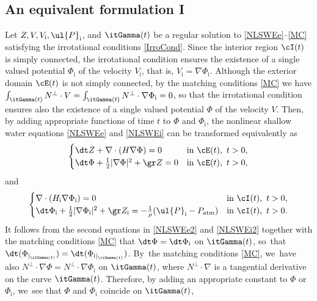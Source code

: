 \subsection{An equivalent formulation I}\label{subsect:EF1}
Let $Z,V,V_\mathrm{i},\ul{P}_\mathrm{i}$, and $\itGamma(t)$ be a regular solution to \eqref{NLSWEe}--\eqref{MC} satisfying the irrotational conditions \eqref{IrroCond}.
Since the interior region $\cI(t)$ is simply connected, the irrotational condition ensures the existence of a single valued potential $\Phi_\mathrm{i}$
of the velocity $V_\mathrm{i}$, that is, $V_\mathrm{i}=\nabla\Phi_\mathrm{i}$.
Although the exterior domain $\cE(t)$ is not simply connected, by the matching conditions \eqref{MC} we have
$\int_{\itGamma(t)}N^\perp\cdot V=\int_{\itGamma(t)}N^\perp\cdot\nabla\Phi_\mathrm{i}=0$,
so that the irrotational condition ensures also the existence of a single valued potential $\Phi$ of the velocity $V$.
Then, by adding appropriate functions of time $t$ to $\Phi$ and $\Phi_\mathrm{i}$,
the nonlinear shallow water equations \eqref{NLSWEe} and \eqref{NLSWEi} can be transformed equivalently as
\begin{equation}\label{NLSWEe2}
\begin{cases}
\dt Z+\nabla\cdot(H\nabla\Phi)=0 &\text{in } \cE(t), \ t>0, \\
\dt\Phi + \frac12|\nabla\Phi|^2 + \gr Z = 0 &\text{in } \cE(t), \ t>0,
\end{cases}
\end{equation}
and
\begin{equation}\label{NLSWEi2}
\begin{cases}
\nabla\cdot(H_\mathrm{i}\nabla\Phi_\mathrm{i})=0 &\text{in } \cI(t), \ t>0, \\
\dt\Phi_\mathrm{i} + \frac12|\nabla\Phi_\mathrm{i}|^2 + \gr Z_\mathrm{i} = -\frac{1}{\rho}(\ul{P}_\mathrm{i}-P_\mathrm{atm}) &\text{in } \cI(t), \ t>0.
\end{cases}
\end{equation}
It follows from the second equations in \eqref{NLSWEe2} and \eqref{NLSWEi2} together with the matching conditions \eqref{MC} that
$\dt\Phi=\dt\Phi_\mathrm{i}$ on $\itGamma(t)$, so~that $\dt(\Phi_{\vert_{\itGamma(t)}})=\dt({ \Phi_\mathrm{i} }_{\vert_{\itGamma(t)}})$. By~the matching conditions \eqref{MC}, we~have also $N^\perp\cdot\nabla\Phi=N^\perp\cdot\nabla\Phi_\mathrm{i}$ on $\itGamma(t)$,
where $N^\perp\cdot\nabla$ is a tangential derivative on the curve $\itGamma(t)$.
Therefore, by adding an appropriate constant to $\Phi$ or $\Phi_\mathrm{i}$, we~see that $\Phi$ and $\Phi_\mathrm{i}$ coincide on $\itGamma(t)$,

